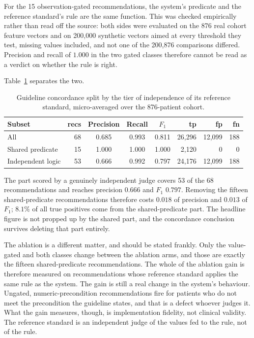 For the 15 observation-gated recommendations, the system's predicate and the reference
standard's rule are the same function. This was checked empirically rather than read off the
source: both sides were evaluated on the 876 real cohort feature vectors and on 200{,}000
synthetic vectors aimed at every threshold they test, missing values included, and not one of
the 200{,}876 comparisons differed. Precision and recall of $1.000$ in the two gated classes
therefore cannot be read as a verdict on whether the rule is right.

Table~\ref{tab:shared-predicate} separates the two.

\begin{table}[h]
\centering
\caption{Guideline concordance split by the tier of independence of its reference standard,
micro-averaged over the 876-patient cohort.}
\label{tab:shared-predicate}
\begin{tabular}{lrcccrrr}
\hline
\textbf{Subset} & \textbf{recs} & \textbf{Precision} & \textbf{Recall} & \textbf{$F_1$} &
\textbf{tp} & \textbf{fp} & \textbf{fn} \\
\hline
All                & 68 & 0.685 & 0.993 & 0.811 & 26{,}296 & 12{,}099 & 188 \\
Shared predicate   & 15 & 1.000 & 1.000 & 1.000 & 2{,}120 & 0 & 0 \\
Independent logic  & 53 & 0.666 & 0.992 & 0.797 & 24{,}176 & 12{,}099 & 188 \\
\hline
\end{tabular}
\end{table}

The part scored by a genuinely independent judge covers 53 of the 68 recommendations and reaches
precision $0.666$ and $F_1$ $0.797$. Removing the fifteen shared-predicate recommendations
therefore costs $0.018$ of precision and $0.013$ of $F_1$; $8.1\%$ of all true positives come
from the shared-predicate part. The headline figure is not propped up by the shared part, and
the concordance conclusion survives deleting that part entirely.

The ablation is a different matter, and should be stated frankly. Only the value-gated and both
classes change between the ablation arms, and those are exactly the fifteen shared-predicate
recommendations. The whole of the ablation gain is therefore measured on recommendations whose
reference standard applies the same rule as the system. The gain is still a real change in the system's behaviour. Ungated, numeric-precondition
recommendations fire for patients who do not meet the precondition the guideline states, and
that is a defect whoever judges it. What the gain measures, though, is implementation
fidelity, not clinical validity. The reference standard is an
independent judge of the values fed to the rule, not of the rule.


